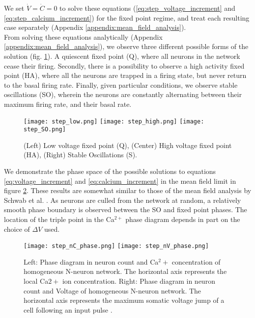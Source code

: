 \documentclass[11pt,letterpaper]{article}
\begin{document}

We set $\dot{V} = \dot{C} = 0$ to solve these equations (\ref{eq:step_voltage_increment} and \ref{eq:step_calcium_increment}) for the fixed point regime, and treat each resulting case separately (Appendix \ref{appendix:mean_field_analysis}).\\

From solving these equations analytically (Appendix \ref{appendix:mean_field_analysis}), we observe three different possible forms of the solution (fig. \ref{fig:step_mean_field}). A quiescent fixed point (Q), where all neurons in the network cease their firing. Secondly, there is a possibility to observe a high activity fixed point (HA), where all the neurons are trapped in a firing state, but never return to the basal firing rate. Finally, given particular conditions, we observe stable oscillations (SO), wherein the neurons are constantly alternating between their maximum firing rate, and their basal rate.\\

\begin{figure}
  \centering
  \texttt{[image: step\_low.png]}
  \texttt{[image: step\_high.png]}
  \texttt{[image: step\_SO.png]}
  \caption{(Left) Low voltage fixed point (Q), (Center) High voltage fixed point (HA), (Right) Stable Oscillations (S).}
  \label{fig:step_mean_field}
\end{figure}

We demonstrate the phase space of the possible solutions to equations \ref{eq:voltage_increment} and \ref{eq:calcium_increment} in the mean field limit in figure \ref{fig:mean_field_phase}. These results are somewhat similar to those of the mean field analysis by Schwab et al. \cite{kcore_paper}. As neurons are culled from the network at random, a relatively smooth phase boundary is observed between the SO and fixed point phases. The location of the triple point in the Ca$^{2+}$ phase diagram depends in part on the choice of $\Delta V$ used.

\begin{figure}
	\centering
    	\texttt{[image: step\_nC\_phase.png]}
        \texttt{[image: step\_nV\_phase.png]}
    \caption{Left: Phase diagram in neuron count and Ca$^2+$ concentration of homogeneous N-neuron network. The horizontal axis represents the local Ca$2+$ ion concentration. Right: Phase diagram in neuron count and Voltage of homogeneous N-neuron network. The horizontal axis represents the maximum somatic voltage jump of a cell following an input pulse \cite{kcore_paper}.}
    \label{fig:mean_field_phase}
\end{figure}
\end{document}

